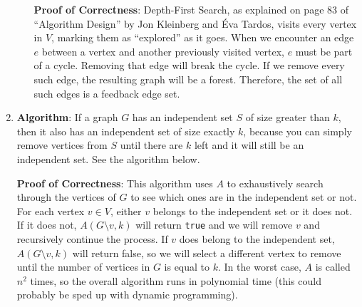\documentclass[a4paper, 10pt]{article}
\begin{document}
\begin{enumerate}
\begin{enumerate}
				\textbf{Proof of Correctness}: Depth-First Search, as explained
				on page 83 of ``Algorithm Design'' by Jon Kleinberg and \'Eva
				Tardos, visits every vertex in $V$, marking them as ``explored''
				as it goes. When we encounter an edge $e$ between a vertex and
				another previously visited vertex, $e$ must be part of a cycle.
				Removing that edge will break the cycle. If we remove every such
				edge, the resulting graph will be a forest. Therefore, the set
				of all such edges is a feedback edge set.

		\end{enumerate}

	\item \textbf{Algorithm}: If a graph $G$ has an independent set $S$ of size
		greater than $k$, then it also has an independent set of size exactly
		$k$, because you can simply remove vertices from $S$ until there are $k$
		left and it will still be an independent set. See the algorithm below.

		\IncMargin{1em}
		\begin{function}[h]
			\BlankLine

		\end{function}

		\textbf{Proof of Correctness}: This algorithm uses $A$ to exhaustively
		search through the vertices of $G$ to see which ones are in the
		independent set or not. For each vertex $v \in V$, either $v$ belongs to
		the independent set or it does not. If it does not, $A(G \setminus v,
		k)$ will return \texttt{true} and we will remove $v$ and recursively
		continue the process. If $v$ does belong to the independent set, $A(G
		\setminus v, k)$ will return false, so we will select a different vertex
		to remove until the number of vertices in $G$ is equal to $k$. In the
		worst case, $A$ is called $n^2$ times, so the overall algorithm runs in
		polynomial time (this could probably be sped up with dynamic
		programming).
\end{enumerate}
\end{document}
